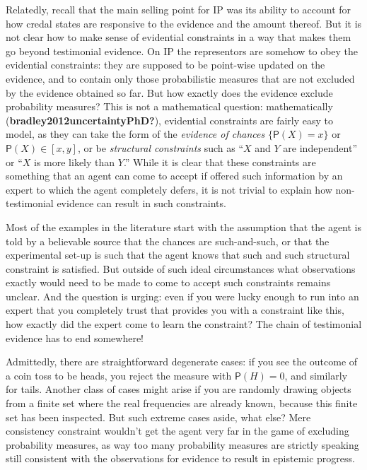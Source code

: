\documentclass[
  10pt,
  dvipsnames,enabledeprecatedfontcommands]{scrartcl}
\begin{document}
Relatedly, recall that the main selling point for \textsf{IP} was its
ability to account for how credal states are responsive to the evidence
and the amount thereof. But it is not clear how to make sense of
evidential constraints in a way that makes them go beyond testimonial
evidence. On \textsf{IP} the representors are somehow to obey the
evidential constraints: they are supposed to be point-wise updated on
the evidence, and to contain only those probabilistic measures that are
not excluded by the evidence obtained so far. But how exactly does the
evidence exclude probability measures? This is not a mathematical
question: mathematically (\textbf{bradley2012uncertaintyPhD?}),
evidential constraints are fairly easy to model, as they can take the
form of the \emph{evidence of chances} \(\{ \mathsf{P}(X) = x\}\) or
\(\mathsf{P}(X) \in [x,y]\), or be \emph{structural constraints} such as
``\(X\) and \(Y\) are independent'' or ``\(X\) is more likely than
\(Y\).'' While it is clear that these constraints are something that an
agent can come to accept if offered such information by an expert to
which the agent completely defers, it is not trivial to explain how
non-testimonial evidence can result in such constraints.

Most of the examples in the literature start with the assumption that
the agent is told by a believable source that the chances are
such-and-such, or that the experimental set-up is such that the agent
knows that such and such structural constraint is satisfied. But outside
of such ideal circumstances what observations exactly would need to be
made to come to accept such constraints remains unclear. And the
question is urging: even if you were lucky enough to run into an expert
that you completely trust that provides you with a constraint like this,
how exactly did the expert come to learn the constraint? The chain of
testimonial evidence has to end somewhere!

Admittedly, there are straightforward degenerate cases: if you see the
outcome of a coin toss to be heads, you reject the measure with
\(\mathsf{P}(H)=0\), and similarly for tails. Another class of cases
might arise if you are randomly drawing objects from a finite set where
the real frequencies are already known, because this finite set has been
inspected. But such extreme cases aside, what else? Mere consistency
constraint wouldn't get the agent very far in the game of excluding
probability measures, as way too many probability measures are strictly
speaking still consistent with the observations for evidence to result
in epistemic progress.
\end{document}

